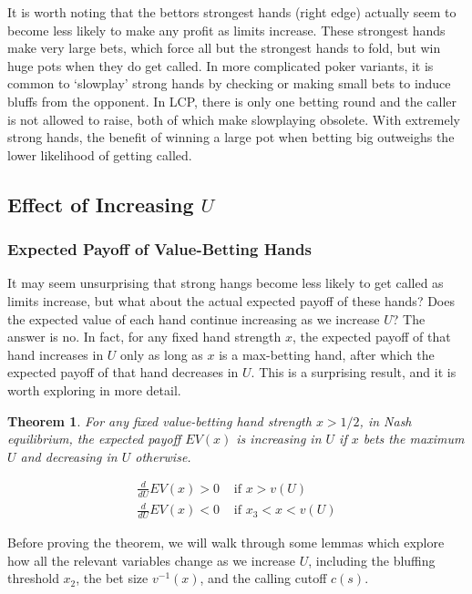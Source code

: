 \documentclass[a4paper,12pt]{article}
\theoremstyle{plain}
\newtheorem{theorem}{Theorem}[section]
\theoremstyle{definition}
\begin{document}

It is worth noting that the bettors strongest hands (right edge) actually seem to become less likely to make any profit as limits increase. These strongest hands make very large bets, which force all but the strongest hands to fold, but win huge pots when they do get called. In more complicated poker variants, it is common to `slowplay' strong hands by checking or making small bets to induce bluffs from the opponent. In LCP, there is only one betting round and the caller is not allowed to raise, both of which make slowplaying obsolete. With extremely strong hands, the benefit of winning a large pot when betting big outweighs the lower likelihood of getting called.

\subsection{Effect of Increasing $U$}

\subsubsection{Expected Payoff of Value-Betting Hands}

It may seem unsurprising that strong hangs become less likely to get called as limits increase, but what about the actual expected payoff of these hands? Does the expected value of each hand continue increasing as we increase $U$? The answer is no. In fact, for any fixed hand strength $x$, the expected payoff of that hand increases in $U$ only as long as $x$ is a max-betting hand, after which the expected payoff of that hand decreases in $U$. This is a surprising result, and it is worth exploring in more detail.

\begin{theorem}
    \label{thm:payoff_increasing}
    For any fixed value-betting hand strength $x>1/2$, in Nash equilibrium, the expected payoff $EV(x)$ is increasing in $U$ if $x$ bets the maximum $U$ and decreasing in $U$ otherwise.

    \begin{align*}
        \frac{d}{dU} EV(x) > 0 & \text{ if } x > v(U) \\ 
        \frac{d}{dU} EV(x) < 0 & \text{ if } x_3 < x < v(U) 
    \end{align*}
\end{theorem}

Before proving the theorem, we will walk through some lemmas which explore how all the relevant variables change as we increase $U$, including the bluffing threshold $x_2$, the bet size $v^{-1}(x)$, and the calling cutoff $c(s)$.
\end{document}

